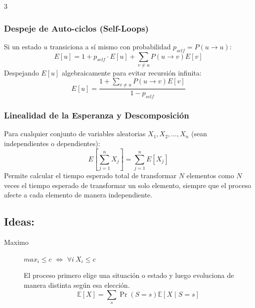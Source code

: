 \documentclass[8pt, spanish, mexico, letterpaper]{extarticle}
\newcommand{\<}{<}
\begin{document}
\begin{multicols*}{3}
\subsubsection{Despeje de Auto-ciclos (Self-Loops)}
Si un estado $u$ transiciona a sí mismo con probabilidad $p_{self} = P(u \to u)$:
$$E[u] = 1 + p_{self} \cdot E[u] + \sum_{v \neq u} P(u \to v) E[v]$$
Despejando $E[u]$ algebraicamente para evitar recursión infinita:
$$E[u] = \frac{1 + \sum_{v \neq u} P(u \to v) E[v]}{1 - p_{self}}$$

\subsubsection{Linealidad de la Esperanza y Descomposición}
Para cualquier conjunto de variables aleatorias $X_1, X_2, \dots, X_n$ (sean independientes o dependientes):
$$E\left[\sum_{j=1}^n X_j\right] = \sum_{j=1}^n E[X_j]$$
Permite calcular el tiempo esperado total de transformar $N$ elementos como $N$ veces el tiempo esperado de transformar un solo elemento, siempre que el proceso afecte a cada elemento de manera independiente.

\subsection{Ideas:}
\begin{description}
    \item[Maximo] $max_i \le c$ $\iff$  $\forall i \ X_i \le c$ 
    \item[] El proceso primero elige una situación o estado y luego evoluciona de manera distinta según esa elección.
    $$ \mathbb E[X]=\sum_s\Pr(S=s)\mathbb E[X\mid S=s]$$
\end{description}





\columnbreak

\end{multicols*}
\end{document}
